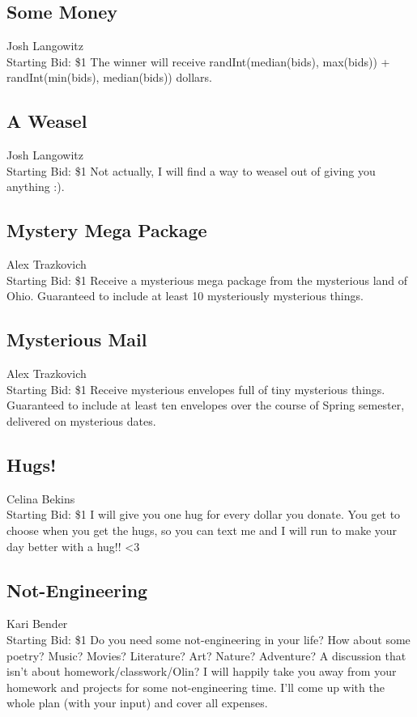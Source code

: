 \documentclass[11pt]{article}
\begin{document}
\subsection{Some Money}
Josh Langowitz
\\
Starting Bid: \$1
\newline
The winner will receive randInt(median(bids), max(bids)) + randInt(min(bids), median(bids)) dollars.
\subsection{A Weasel}
Josh Langowitz
\\
Starting Bid: \$1
\newline
Not actually, I will find a way to weasel out of giving you anything :).
\subsection{Mystery Mega Package}
Alex Trazkovich
\\
Starting Bid: \$1
\newline
Receive a mysterious mega package from the mysterious land of Ohio.  Guaranteed to include at least 10 mysteriously mysterious things.
\subsection{Mysterious Mail}
Alex Trazkovich
\\
Starting Bid: \$1
\newline
Receive mysterious envelopes full of tiny mysterious things.   Guaranteed to include at least ten envelopes over the course of Spring semester, delivered on mysterious dates.
\subsection{Hugs!}
Celina Bekins
\\
Starting Bid: \$1
\newline
I will give you one hug for every dollar you donate. You get to choose when you get the hugs, so you can text me and I will run to make your day better with a hug!! <3
\subsection{Not-Engineering}
Kari Bender
\\
Starting Bid: \$1
\newline
Do you need some not-engineering in your life?
How about some poetry? Music? Movies? Literature? Art? Nature? Adventure? A discussion that isn't about homework/classwork/Olin?
I will happily take you away from your homework and projects for some not-engineering time. I'll come up with the whole plan (with your input) and cover all expenses.
\end{document}
